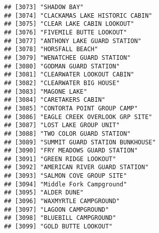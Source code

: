 \documentclass[
]{article}
\begin{document}
\begin{verbatim}
## [3073] "SHADOW BAY"                                                                          
## [3074] "CLACKAMAS LAKE HISTORIC CABIN"                                                       
## [3075] "CLEAR LAKE CABIN LOOKOUT"                                                            
## [3076] "FIVEMILE BUTTE LOOKOUT"                                                              
## [3077] "ANTHONY LAKE GUARD STATION"                                                          
## [3078] "HORSFALL BEACH"                                                                      
## [3079] "WENATCHEE GUARD STATION"                                                             
## [3080] "GODMAN GUARD STATION"                                                                
## [3081] "CLEARWATER LOOKOUT CABIN"                                                            
## [3082] "CLEARWATER BIG HOUSE"                                                                
## [3083] "MAGONE LAKE"                                                                         
## [3084] "CARETAKERS CABIN"                                                                    
## [3085] "CONTORTA POINT GROUP CAMP"                                                           
## [3086] "EAGLE CREEK OVERLOOK GRP SITE"                                                       
## [3087] "LOST LAKE GROUP UNIT"                                                                
## [3088] "TWO COLOR GUARD STATION"                                                             
## [3089] "SUMMIT GUARD STATION BUNKHOUSE"                                                      
## [3090] "FRY MEADOWS GUARD STATION"                                                           
## [3091] "GREEN RIDGE LOOKOUT"                                                                 
## [3092] "AMERICAN RIVER GUARD STATION"                                                        
## [3093] "SALMON COVE GROUP SITE"                                                              
## [3094] "Middle Fork Campground"                                                              
## [3095] "ALDER DUNE"                                                                          
## [3096] "WAXMYRTLE CAMPGROUND"                                                                
## [3097] "LAGOON CAMPGROUND"                                                                   
## [3098] "BLUEBILL CAMPGROUND"                                                                 
## [3099] "GOLD BUTTE LOOKOUT"                                                                  

\end{verbatim}
\end{document}
